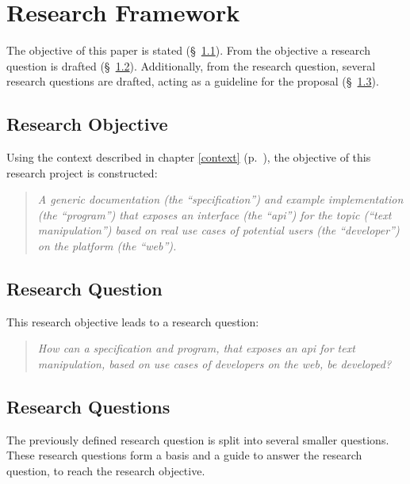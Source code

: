 \chapter{Research Framework}\label{research-framework}

The objective of this paper is stated (§~\ref{research-objective}).
From the objective a research question is drafted
  (§~\ref{research-question}).
Additionally, from the research question, several research questions are
  drafted, acting as a guideline for the proposal
  (§~\ref{research-questions}).

\section{Research Objective}\label{research-objective}

Using the context described in chapter \ref{context} (p.~\pageref{context}),
  the objective of this research project is constructed:

\begin{quote}
  \textit{A generic documentation (the ``specification'') and example
    implementation (the ``program'') that exposes an interface (the
    ``\acrshort{api}'') for the topic (``text manipulation'') based on real
    use cases of potential users (the ``developer'') on the platform (the
    ``web'').
  }
\end{quote}

\section{Research Question}\label{research-question}

This research objective leads to a research question:

\begin{quote}
  \textit{How can a specification and program, that exposes an \acrshort{api}
    for text manipulation, based on use cases of developers on the web,
    be developed?
  }
\end{quote}

\section{Research Questions}\label{research-questions}

The previously defined research question is split into several smaller
  questions.
These research questions form a basis and a guide to answer the research
  question, to reach the research objective.

